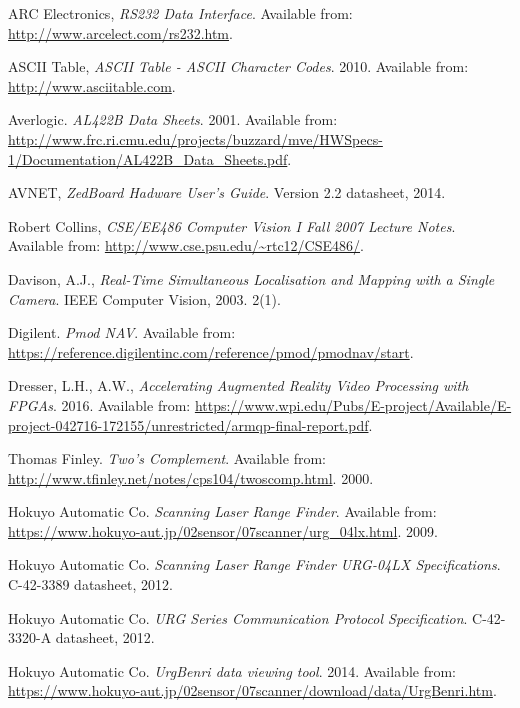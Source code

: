 \begin{thebibliography}{9}

ARC Electronics, \textit{RS232 Data Interface}. Available from: \url{http://www.arcelect.com/rs232.htm}.

ASCII Table, \textit{ASCII Table - ASCII Character Codes}. 2010. Available from: \url{http://www.asciitable.com}.

Averlogic.
\textit{AL422B Data Sheets}. 2001.
Available from: \url{http://www.frc.ri.cmu.edu/projects/buzzard/mve/HWSpecs-1/Documentation/AL422B_Data_Sheets.pdf}.

AVNET, \textit{ZedBoard Hadware User's Guide}. Version 2.2 datasheet, 2014.

Robert Collins, \textit{CSE/EE486 Computer Vision I Fall 2007 Lecture Notes}. Available from: \url{http://www.cse.psu.edu/~rtc12/CSE486/}.

Davison, A.J.,
\textit{Real-Time Simultaneous Localisation and Mapping with a Single Camera}. 
IEEE Computer Vision, 2003. 2(1).

Digilent. \textit{Pmod NAV}. Available from: \url{https://reference.digilentinc.com/reference/pmod/pmodnav/start}.

Dresser, L.H., A.W., \textit{Accelerating Augmented Reality Video Processing with FPGAs}. 2016. Available from: \url{https://www.wpi.edu/Pubs/E-project/Available/E-project-042716-172155/unrestricted/armqp-final-report.pdf}.

Thomas Finley. \textit{Two's Complement}. Available from: \url{http://www.tfinley.net/notes/cps104/twoscomp.html}. 2000.

Hokuyo Automatic Co. \textit{Scanning Laser Range Finder}. Available from: \url{https://www.hokuyo-aut.jp/02sensor/07scanner/urg_04lx.html}. 2009.

Hokuyo Automatic Co. \textit{Scanning Laser Range Finder URG-04LX Specifications}. C-42-3389 datasheet, 2012.

Hokuyo Automatic Co. \textit{URG Series Communication Protocol Specification}. C-42-3320-A datasheet, 2012.

Hokuyo Automatic Co. \textit{UrgBenri data viewing tool}. 2014. Available from: \url{https://www.hokuyo-aut.jp/02sensor/07scanner/download/data/UrgBenri.htm}.


\end{thebibliography}
